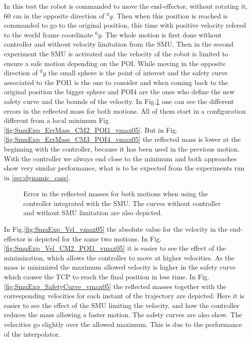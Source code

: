 In this test the robot is commanded to move the end-effector, without rotating it, 60 cm in the opposite direction of ${}^{0}_{}y$. Then when this position is reached is commanded to go to the original position, this time with positive velocity refered to the world frame coordinate ${}^{0}_{}y$.
The whole motion is first done without controller and without velocity limitation from the SMU. Then in the second experiment the SMU is activated and the velocity of the robot is limited to ensure a safe motion depending on the POI. While moving in the opposite direction of ${}^{0}_{}y$ the small sphere is the point of interest and the safety curve associated to the POI1 is the one to consider and when coming back to the original position the bigger sphere and POI4 are the ones who define the new safety curve and the bounds of the velocity.
In  Fig.\ref{fig:SmuExp_ErrMass_vmax05} one can see the different errors in the reflected mass for both motions. All of them start in a configuration different from a local minimum Fig.\ref{fig:SmuExp_ErrMass_CM2_POI1_vmax05}. But in Fig.\ref{fig:SmuExp_ErrMass_CM3_POI4_vmax05} the reflected mass is lower at the beginning with the controller, because it has been used in the previous motion. With the controller we always end close to the minimum and both approaches show very similar performance, what is to be expected from the experiments run in \ref{sec:dynamic_case}.
%
%
%
\begin{figure}[htp!]
	\centering	
	 	 	
	\caption{Error in the reflected masses for both motions when using the controller integrated with the SMU. The curves without controller and without SMU limitation are also depicted.}
	\label{fig:SmuExp_ErrMass_vmax05}
\end{figure}
%
%
In Fig.\ref{fig:SmuExp_Vel_vmax05} the absolute value for the velocity in the end-effector is depicted for the same two motions. In Fig.\ref{fig:SmuExp_Vel_CM2_POI1_vmax05} it is easier to see the effect of the minimization, which allows the controller to move at higher velocities. As the mass is minimized the maximum allowed velocity is higher in the safety curve which causes the TCP to reach the final position in less time.
In Fig.\ref{fig:SmuExp_SafetyCurve_vmax05} the reflected masses together with the corresponding velocities for each instant of the trajectory are depicted. Here it is easier to see the effect of the SMU limiting the velocity, and how the controller reduces the mass allowing a faster motion. The safety curves are also show.
%
The velocities go slightly over the allowed maximum. This is due to the performance of the interpolator.

